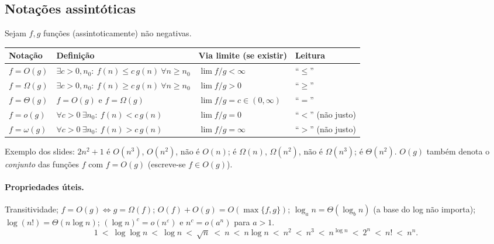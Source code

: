 \subsection{Notações assintóticas}
Sejam $f,g$ funções (assintoticamente) não negativas.
\begin{center}
\begin{tabular}{@{}llll@{}}
\toprule
Notação & Definição & Via limite (se existir) & Leitura\\
\midrule
$f=O(g)$ & $\exists c>0,n_0:\ f(n)\le c\,g(n)\ \forall n\ge n_0$ & $\lim f/g<\infty$ & ``$\le$''\\
$f=\Omega(g)$ & $\exists c>0,n_0:\ f(n)\ge c\,g(n)\ \forall n\ge n_0$ & $\lim f/g>0$ & ``$\ge$''\\
$f=\Theta(g)$ & $f=O(g)$ e $f=\Omega(g)$ & $\lim f/g=c\in(0,\infty)$ & ``$=$''\\
$f=o(g)$ & $\forall c>0\ \exists n_0:\ f(n)<c\,g(n)$ & $\lim f/g=0$ & ``$<$'' (não justo)\\
$f=\omega(g)$ & $\forall c>0\ \exists n_0:\ f(n)>c\,g(n)$ & $\lim f/g=\infty$ & ``$>$'' (não justo)\\
\bottomrule
\end{tabular}
\end{center}
Exemplo dos slides: $2n^2+1$ é $O(n^3)$, $O(n^2)$, não é $O(n)$; é $\Omega(n)$, $\Omega(n^2)$, não é $\Omega(n^3)$; é $\Theta(n^2)$.
$O(g)$ também denota o \emph{conjunto} das funções $f$ com $f=O(g)$ (escreve-se $f\in O(g)$).

\paragraph{Propriedades úteis.} Transitividade; $f=O(g)\iff g=\Omega(f)$; $O(f)+O(g)=O(\max\{f,g\})$; $\log_a n=\Theta(\log_b n)$ (a base do log não importa); $\log(n!)=\Theta(n\log n)$; $(\log n)^c=o(n^\varepsilon)$ e $n^c=o(a^n)$ para $a>1$.
\[
1\ <\ \log\log n\ <\ \log n\ <\ \sqrt n\ <\ n\ <\ n\log n\ <\ n^2\ <\ n^3\ <\ n^{\log n}\ <\ 2^n\ <\ n!\ <\ n^n .
\]

